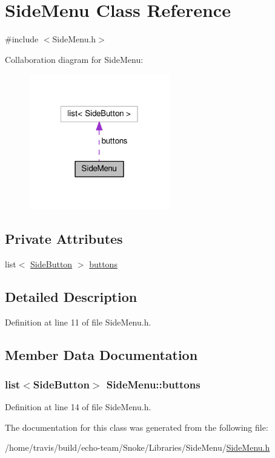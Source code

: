 \hypertarget{class_side_menu}{\section{Side\-Menu Class Reference}
\label{class_side_menu}
}


{\ttfamily \#include $<$Side\-Menu.\-h$>$}



Collaboration diagram for Side\-Menu\-:
\nopagebreak
\begin{figure}[H]
\begin{center}
\leavevmode
\includegraphics[width=174pt]{class_side_menu__coll__graph}
\end{center}
\end{figure}
\subsection*{Private Attributes}
\begin{DoxyCompactItemize}
\item 
list$<$ \hyperlink{struct_side_button}{Side\-Button} $>$ \hyperlink{class_side_menu_af6b73f113ae5b74a238f5b167c8902cb}{buttons}
\end{DoxyCompactItemize}


\subsection{Detailed Description}


Definition at line 11 of file Side\-Menu.\-h.



\subsection{Member Data Documentation}
\hypertarget{class_side_menu_af6b73f113ae5b74a238f5b167c8902cb}{
\subsubsection[{buttons}]{\setlength{\rightskip}{0pt plus 5cm}list$<${\bf Side\-Button}$>$ Side\-Menu\-::buttons\hspace{0.3cm}{\ttfamily [private]}}}\label{class_side_menu_af6b73f113ae5b74a238f5b167c8902cb}


Definition at line 14 of file Side\-Menu.\-h.



The documentation for this class was generated from the following file\-:\begin{DoxyCompactItemize}
\item 
/home/travis/build/echo-\/team/\-Snoke/\-Libraries/\-Side\-Menu/\hyperlink{_side_menu_8h}{Side\-Menu.\-h}\end{DoxyCompactItemize}
